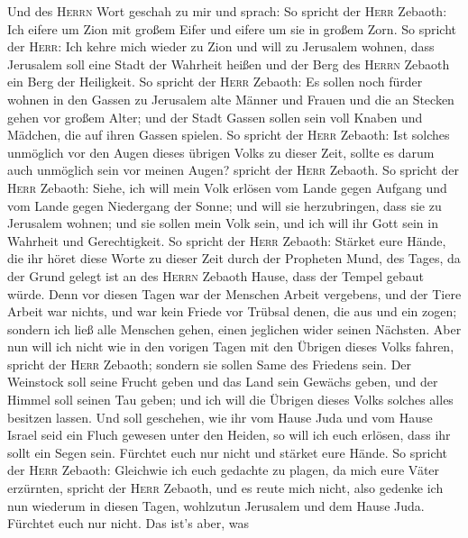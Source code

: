  Und des \textsc{Herrn} Wort geschah zu mir und sprach:
 So spricht der \textsc{Herr} Zebaoth: Ich eifere um Zion
mit großem Eifer und eifere um sie in großem Zorn.  So
spricht der \textsc{Herr}: Ich kehre mich wieder zu Zion und will zu
Jerusalem wohnen, dass Jerusalem soll eine Stadt der Wahrheit heißen und
der Berg des \textsc{Herrn} Zebaoth ein Berg der Heiligkeit.
 So spricht der \textsc{Herr} Zebaoth: Es sollen noch
fürder wohnen in den Gassen zu Jerusalem alte Männer und Frauen und die
an Stecken gehen vor großem Alter;  und der Stadt Gassen
sollen sein voll Knaben und Mädchen, die auf ihren Gassen spielen.
 So spricht der \textsc{Herr} Zebaoth: Ist solches
unmöglich vor den Augen dieses übrigen Volks zu dieser Zeit, sollte es
darum auch unmöglich sein vor meinen Augen? spricht der \textsc{Herr}
Zebaoth.  So spricht der \textsc{Herr} Zebaoth: Siehe, ich
will mein Volk erlösen vom Lande gegen Aufgang und vom Lande gegen
Niedergang der Sonne;  und will sie herzubringen, dass sie
zu Jerusalem wohnen; und sie sollen mein Volk sein, und ich will ihr
Gott sein in Wahrheit und Gerechtigkeit.  So spricht der
\textsc{Herr} Zebaoth: Stärket eure Hände, die ihr höret diese Worte zu
dieser Zeit durch der Propheten Mund, des Tages, da der Grund gelegt ist
an des \textsc{Herrn} Zebaoth Hause, dass der Tempel gebaut würde.
 Denn vor diesen Tagen war der Menschen Arbeit vergebens,
und der Tiere Arbeit war nichts, und war kein Friede vor Trübsal denen,
die aus und ein zogen; sondern ich ließ alle Menschen gehen, einen
jeglichen wider seinen Nächsten.  Aber nun will ich nicht
wie in den vorigen Tagen mit den Übrigen dieses Volks fahren, spricht
der \textsc{Herr} Zebaoth;  sondern sie sollen Same des
Friedens sein. Der Weinstock soll seine Frucht geben und das Land sein
Gewächs geben, und der Himmel soll seinen Tau geben; und ich will die
Übrigen dieses Volks solches alles besitzen lassen.  Und
soll geschehen, wie ihr vom Hause Juda und vom Hause Israel seid ein
Fluch gewesen unter den Heiden, so will ich euch erlösen, dass ihr sollt
ein Segen sein. Fürchtet euch nur nicht und stärket eure Hände.
 So spricht der \textsc{Herr} Zebaoth: Gleichwie ich euch
gedachte zu plagen, da mich eure Väter erzürnten, spricht der
\textsc{Herr} Zebaoth, und es reute mich nicht,  also
gedenke ich nun wiederum in diesen Tagen, wohlzutun Jerusalem und dem
Hause Juda. Fürchtet euch nur nicht.  Das ist's aber, was
